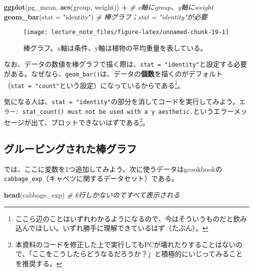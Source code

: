 \documentclass[]{book}
\newenvironment{Shaded}{\begin{snugshade}}{\end{snugshade}}
\newcommand{\KeywordTok}[1]{\textcolor[rgb]{0.13,0.29,0.53}{\textbf{#1}}}
\newcommand{\DataTypeTok}[1]{\textcolor[rgb]{0.13,0.29,0.53}{#1}}
\newcommand{\StringTok}[1]{\textcolor[rgb]{0.31,0.60,0.02}{#1}}
\newcommand{\CommentTok}[1]{\textcolor[rgb]{0.56,0.35,0.01}{\textit{#1}}}
\newcommand{\OperatorTok}[1]{\textcolor[rgb]{0.81,0.36,0.00}{\textbf{#1}}}
\newcommand{\NormalTok}[1]{#1}
\let\rmarkdownfootnote\footnote%
\def\footnote{\protect\rmarkdownfootnote}
\begin{document}
\begin{Shaded}
\begin{Highlighting}[]
\KeywordTok{ggplot}\NormalTok{(pg_mean, }\KeywordTok{aes}\NormalTok{(group, weight)) }\OperatorTok{+}\StringTok{ }\CommentTok{# x軸にgroup、y軸にweight}
\StringTok{  }\KeywordTok{geom_bar}\NormalTok{(}\DataTypeTok{stat =} \StringTok{"identity"}\NormalTok{) }\CommentTok{# 棒グラフ；stat = "identity"が必要}
\end{Highlighting}
\end{Shaded}

\begin{figure}

{\centering \texttt{[image: lecture\_note\_files/figure-latex/unnamed-chunk-19-1]} 

}

\caption{棒グラフ。x軸は条件、y軸は植物の平均重量を表している。}\label{fig:unnamed-chunk-19}
\end{figure}

なお、データの数値を棒グラフで描く際は、\texttt{stat\ =\ "identity"}と設定する必要がある。なぜなら、\texttt{geom\_bar()}は、データの\textbf{個数}を描くのがデフォルト（\texttt{stat\ =\ "count"}という設定）になっているからである\footnote{ここら辺のことはいずれわかるようになるので、今はそういうものだと飲み込んでほしい。いずれ勝手に理解できているはず（たぶん）。}。

気になる人は、\texttt{stat\ =\ "identity"}の部分を消してコードを実行してみよう。\texttt{エラー:\ stat\_count()\ must\ not\ be\ used\ with\ a\ y\ aesthetic.}というエラーメッセージが出て、プロットできないはずである\footnote{本資料のコードを修正した上で実行してもPCが壊れたりすることはないので、「ここをこうしたらどうなるだろうか？」と積極的にいじってみることを推奨する。}。

\subsection{グルーピングされた棒グラフ}

では、ここに変数を1つ追加してみよう。次に使うデータはgcookbookの\texttt{cabbage\_exp}（キャベツに関するデータセット）である。

\begin{Shaded}
\begin{Highlighting}[]
\KeywordTok{head}\NormalTok{(cabbage_exp) }\CommentTok{# 6行しかないのですべて表示される}
\end{Highlighting}
\end{Shaded}
\end{document}
